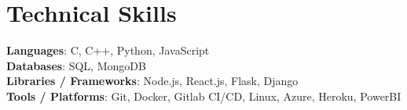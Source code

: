 \documentclass[letterpaper,11pt]{article}
\makeatletter
\newcommand{\resumeItem}[1]{
  \item\small{
    {#1 \vspace{-2pt}}
  }
}
\newcommand{\resumeSubheading}[4]{
  \vspace{-2pt}\item
    \begin{tabular*}{1.0\textwidth}[t]{l@{\extracolsep{\fill}}r}
      \textbf{#1} & \textbf{\small #2} \\
      \textit{\small#3} & \textit{\small #4} \\
    \end{tabular*}\vspace{-7pt}
}
\newcommand{\resumeSubHeadingListStart}{\begin{itemize}[leftmargin=0.0in, label={}]}
\newcommand{\resumeSubHeadingListEnd}{\end{itemize}}
\newcommand{\resumeItemListStart}{\begin{itemize}}
\newcommand{\resumeItemListEnd}{\end{itemize}\vspace{-5pt}}
\makeatother
\begin{document}
 
%
\section{Technical Skills}
 \begin{itemize}[leftmargin=0.15in, label={}]
    \small{\item{
     \textbf{Languages}{: C, C++, Python, JavaScript} \\
     \textbf{Databases}{: SQL, MongoDB } \\
     \textbf{Libraries / Frameworks}{: Node.js, React.js, Flask, Django} \\
     \textbf{Tools / Platforms}{: Git, Docker, Gitlab CI/CD, Linux, Azure, Heroku, PowerBI} \\
    }}
 \end{itemize}
 \vspace{-16pt}



        
\end{document}
